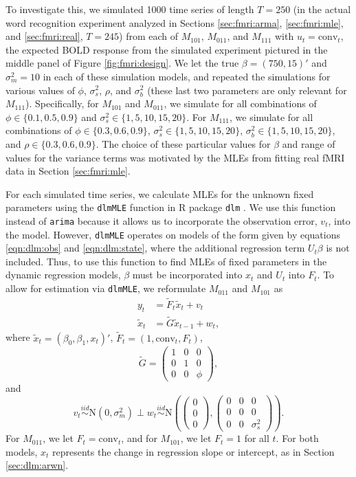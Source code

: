 To investigate this, we simulated 1000 time series of length $T = 250$ (in the actual word recognition experiment analyzed in Sections \ref{sec:fmri:arma}, \ref{sec:fmri:mle}, and \ref{sec:fmri:real}, $T = 245$) from each of $M_{101}$, $M_{011}$, and $M_{111}$ with $u_t = \mbox{conv}_t$, the expected BOLD response from the simulated experiment pictured in the middle panel of Figure \ref{fig:fmri:design}. We let the true $\beta = (750, 15)'$ and $\sigma^2_m = 10$ in each of these simulation models, and repeated the simulations for various values of $\phi$, $\sigma^2_s$, $\rho$, and $\sigma^2_b$ (these last two parameters are only relevant for $M_{111}$). Specifically, for $M_{101}$ and $M_{011}$, we simulate for all combinations of $\phi \in \{0.1, 0.5, 0.9\}$ and $\sigma^2_s \in \{1, 5, 10, 15, 20\}$. For $M_{111}$, we simulate for all combinations of $\phi \in \{0.3, 0.6, 0.9\}$, $\sigma^2_s \in \{1, 5, 10, 15, 20\}$, $\sigma^2_b \in \{1, 5, 10, 15, 20\}$, and $\rho \in \{0.3, 0.6, 0.9\}$. The choice of these particular values for $\beta$ and range of values for the variance terms was motivated by the MLEs from fitting real fMRI data in Section \ref{sec:fmri:mle}.

For each simulated time series, we calculate MLEs for the unknown fixed parameters using the {\tt dlmMLE} function in R package {\tt dlm} \citep{petris:camp:2009:dynamic}. We use this function instead of {\tt arima} because it allows us to incorporate the observation error, $v_t$, into the model. However, {\tt dlmMLE} operates on models of the form given by equations \eqref{eqn:dlm:obs} and \eqref{eqn:dlm:state}, where the additional regression term $U_t\beta$ is not included. Thus, to use this function to find MLEs of fixed parameters in the dynamic regression models, $\beta$ must be incorporated into $x_t$ and $U_t$ into $F_t$. To allow for estimation via {\tt dlmMLE}, we reformulate $M_{011}$ and $M_{101}$ as
\begin{align}
y_t &= \tilde{F}_t\tilde{x}_t + v_t \label{eqn:dlmmle:obs} \\
\tilde{x}_t &= \tilde{G}\tilde{x}_{t-1} + w_t, \label{eqn:dlmmle:state}
\end{align}
where $\tilde{x}_t = (\beta_0,\beta_1,x_t)'$, $\tilde{F}_t = (1,\mbox{conv}_t,F_t)$,
\[\tilde{G} = \left(\begin{array}{ccc} 1 & 0 & 0 \\ 0 & 1 & 0 \\ 0 & 0 & \phi\end{array}\right), \]
and \[v_t \stackrel{iid}{\sim} \mbox{N}(0,\sigma^2_m) \perp w_t \stackrel{iid}{\sim} \mbox{N}\left(\left(\begin{array}{c} 0 \\ 0 \\ 0 \end{array}\right), \left(\begin{array}{ccc} 0 & 0 & 0 \\ 0 & 0 & 0 \\ 0 & 0 & \sigma^2_s \end{array}\right)\right).\]
For $M_{011}$, we let $F_t = \mbox{conv}_t$, and for $M_{101}$, we let $F_t = 1$ for all $t$. For both models, $x_t$ represents the change in regression slope or intercept, as in Section \eqref{sec:dlm:arwn}.

